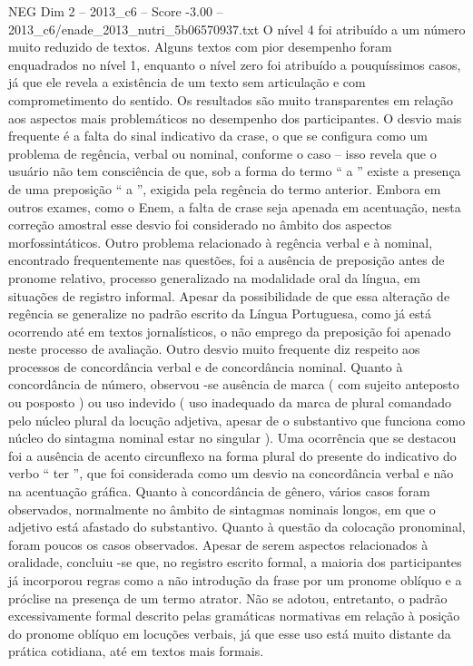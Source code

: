 \begin{textsample}{NEG Dim 2 – 2013\_c6 – Score -3.00 – 2013\_c6/enade\_2013\_nutri\_5b06570937.txt}
O nível 4 foi atribuído a um número muito reduzido de textos.
Alguns textos com pior desempenho foram enquadrados no nível 1, enquanto o nível zero foi atribuído a pouquíssimos casos, já que ele revela a existência de um texto sem articulação e com comprometimento do sentido.
Os resultados são muito transparentes em relação aos aspectos mais problemáticos no desempenho dos participantes.
O desvio mais frequente é a falta do sinal indicativo da crase, o que se configura como um problema de regência, verbal ou nominal, conforme o caso – isso revela que o usuário não tem consciência de que, sob a forma do termo “ a ” existe a presença de uma preposição “ a ”, exigida pela regência do termo anterior.
Embora em outros exames, como o Enem, a falta de crase seja apenada em acentuação, nesta correção amostral esse desvio foi considerado no âmbito dos aspectos morfossintáticos.
Outro problema relacionado à regência verbal e à nominal, encontrado frequentemente nas questões, foi a ausência de preposição antes de pronome relativo, processo generalizado na modalidade oral da língua, em situações de registro informal.
Apesar da possibilidade de que essa alteração de regência se generalize no padrão escrito da Língua Portuguesa, como já está ocorrendo até em textos jornalísticos, o não emprego da preposição foi apenado neste processo de avaliação.
Outro desvio muito frequente diz respeito aos processos de concordância verbal e de concordância nominal.
Quanto à concordância de número, observou -se ausência de marca ( com sujeito anteposto ou posposto ) ou uso indevido ( uso inadequado da marca de plural comandado pelo núcleo plural da locução adjetiva, apesar de o substantivo que funciona como núcleo do sintagma nominal estar no singular ).
Uma ocorrência que se destacou foi a ausência de acento circunflexo na forma plural do presente do indicativo do verbo “ ter ”, que foi considerada como um desvio na concordância verbal e não na acentuação gráfica.
Quanto à concordância de gênero, vários casos foram observados, normalmente no âmbito de sintagmas nominais longos, em que o adjetivo está afastado do substantivo.
Quanto à questão da colocação pronominal, foram poucos os casos observados.
Apesar de serem aspectos relacionados à oralidade, concluiu -se que, no registro escrito formal, a maioria dos participantes já incorporou regras como a não introdução da frase por um pronome oblíquo e a próclise na presença de um termo atrator.
Não se adotou, entretanto, o padrão excessivamente formal descrito pelas gramáticas normativas em relação à posição do pronome oblíquo em locuções verbais, já que esse uso está muito distante da prática cotidiana, até em textos mais formais.

\end{textsample}
